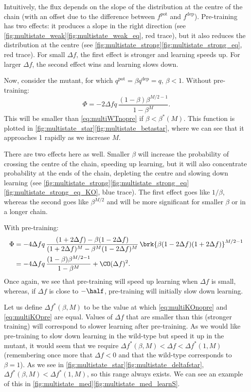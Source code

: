 \documentclass[12pt]{article}
\newcommand{\pot}{^{\text{pot}}}
\newcommand{\dep}{^{\text{dep}}}
\begin{document}
Intuitively, the flux depends on the slope of the distribution at the centre of the chain (with an offset due to the difference between $f\pot$ and $f\dep$).
Pre-training has two effects: it produces a slope in the right direction (see \autoref{fig:multistate_weak}\ref{fig:multistate_weak_eq}, red trace), but it also reduces the distribution at the centre (see \autoref{fig:multistate_strong}\ref{fig:multistate_strong_eq}, red trace).
For small $\Delta f$, the first effect is stronger and learning speeds up.
For larger $\Delta f$, the second effect wins and learning slows down.

Now, consider the mutant, for which $q\pot=\beta q\dep=q$, $\beta<1$.
Without pre-training:
%
\begin{equation}\label{eq:multiKOnopre}
  \Phi = -2\Delta f q\,\frac{(1-\beta)\beta^{M/2-1}}{1-\beta^M}.
\end{equation}
%
This will be smaller than \eqref{eq:multiWTnopre} if $\beta<\beta^*(M)$.
This function is plotted in \autoref{fig:multistate_star}\ref{fig:multistate_betastar}, where we can see that it approaches 1 rapidly as we increase $M$.

There are two effects here as well.
Smaller $\beta$ will increase the probability of crossing the centre of the chain, speeding up learning, but it will also concentrate probability at the ends of the chain, depleting the centre and slowing down learning (see \autoref{fig:multistate_strong}\ref{fig:multistate_strong_eq}\ref{fig:multistate_strong_eq_KO}, blue trace).
The first effect goes like $1/\beta$, whereas the second goes like $\beta^{M/2}$ and will be more significant for smaller $\beta$ or in a longer chain.

With pre-training:
%
\begin{equation}\label{eq:multiKOpre}
\begin{aligned}
  \Phi &= -4\Delta f q \, \frac{(1+2\Delta f) - \beta(1-2\Delta f)}
          {(1+2\Delta f)^M - \beta^M(1-2\Delta f)^M}   \,
          \brk{\beta (1-2\Delta f) (1+2\Delta f)}^{M/2-1} \\
       &= -4\Delta f q\,\frac{(1-\beta)\beta^{M/2-1}}{1-\beta^M} + \CO(\Delta f)^2.
\end{aligned}
\end{equation}
%
Once again, we see that pre-training will speed up learning when $\Delta f$ is small, whereas, if $\Delta f$ is close to $-\half$, pre-training will initially slow down learning.

Let us define $\Delta f^*(\beta,M)$ to be the value at which \eqref{eq:multiKOnopre} and \eqref{eq:multiKOpre} are equal.
Values of $\Delta f$ that are smaller than this (stronger training) will correspond to slower learning after pre-training.
As we would like pre-training to slow down learning in the wild-type but speed it up in the mutant, it would seem that we require $\Delta f^*(\beta,M) < \Delta f < \Delta f^*(1,M)$ (remembering once more that $\Delta f<0$ and that the wild-type corresponds to $\beta=1$).
As we see in \autoref{fig:multistate_star}\ref{fig:multistate_deltafstar}, $\Delta f^*(\beta,M) < \Delta f^*(1,M)$, so this range always exists.
We can see an example of this in \autoref{fig:multistate_med}\ref{fig:multistate_med_learnS}.
\end{document}
